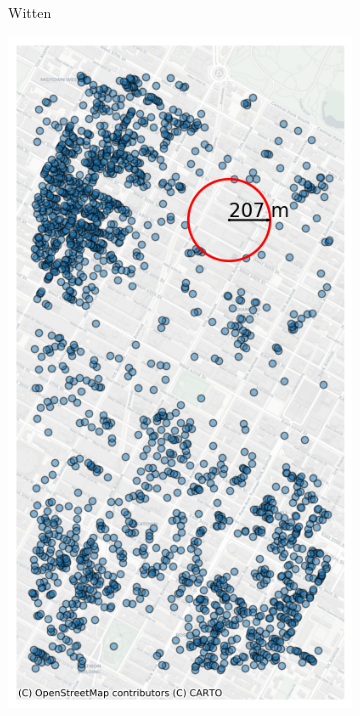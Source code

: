 \begin{figure}[!t]
\begin{minipage}[b]{0.50\textwidth}
\begin{subfigure}[b]{\linewidth}
     \caption{Witten}\label{subfig-3:dummy}
   \end{subfigure}
 \end{minipage}
 \hfill
 \begin{subfigure}[b]{0.45\textwidth}
 \centering
 \includegraphics[clip, trim=0.0cm 0.0cm 0.0cm 0.0cm, width=\linewidth]{chapter_5_mapping/imgs/newyork_ls_max_dist.png}

\end{subfigure}
\end{figure}
